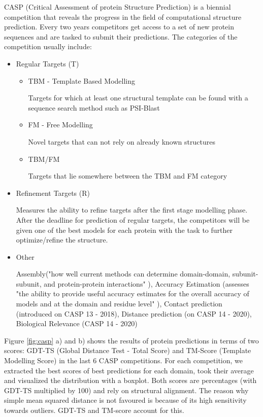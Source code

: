 CASP (Critical Assessment of protein Structure Prediction) is a biennial competition that reveals the progress in the field of computational structure prediction. 
Every two years competitors get access to a set of new protein sequences and are tasked to submit their predictions. 
The categories of the competition usually include:
\begin{itemize}
    \item Regular Targets (T)
    
    \begin{itemize}
        \item TBM - Template Based Modelling
        
        Targets for which at least one structural template can be found with a sequence search method such as PSI-Blast
        \item FM - Free Modelling
        
        Novel targets that can not rely on already known structures
        \item TBM/FM
        
        Targets that lie somewhere between the TBM and FM category
    \end{itemize}
    
    \item Refinement Targets (R)
    
        Measures the ability to refine targets after the first stage modelling phase. After the deadline for prediction of regular targets, the competitors will be given one of the best models for each protein with the task to further optimize/refine the structure.
        
    \item Other
    
    Assembly("how well current methods can determine domain-domain, subunit-subunit, and protein-protein interactions" \cite{casp}), Accuracy Estimation (assesses "the ability to provide useful accuracy estimates for the overall accuracy of models and at the domain and residue level" \cite{casp}), Contact prediction (introduced on CASP 13 - 2018), Distance prediction (on CASP 14 - 2020), Biological Relevance (CASP 14 - 2020) \cite{casp, casp13}
\end{itemize}

Figure \ref{fig:casp} a) and b) shows the results of protein predictions in terms of two scores: GDT-TS (Global Distance Test - Total Score) and TM-Score (Template Modelling Score) in the last 6 CASP competitions. 
For each competition, we extracted the best scores of best predictions for each domain, took their average and visualized the distribution with a boxplot.
Both scores are percentages (with GDT-TS multiplied by 100) and rely on structural alignment. 
The reason why simple mean squared distance is not favoured is because of its high sensitivity towards outliers. 
GDT-TS and TM-score account for this. 

